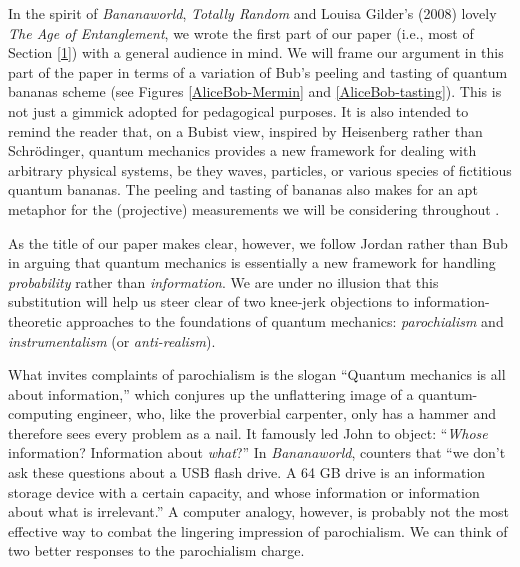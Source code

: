 In the spirit of \emph{Bananaworld}, \emph{Totally Random} and Louisa Gilder's (2008) lovely \emph{The Age of Entanglement}, we wrote the first part of our paper (i.e., most of Section \ref{1}) with a general audience in mind. We will frame our argument in this part of the paper in terms of a variation of Bub's peeling and tasting of quantum bananas scheme (see Figures \ref{AliceBob-Mermin} and \ref{AliceBob-tasting}). This is not just a gimmick adopted for pedagogical purposes. It is also intended to remind the reader that, on a Bubist view, inspired by Heisenberg rather than Schr\"odinger, quantum mechanics provides a new framework for dealing with arbitrary physical systems, be they waves, particles, or various species of fictitious quantum bananas. The peeling and tasting of bananas also makes for an apt metaphor for the (projective) measurements we will be considering throughout \citep{Popescu 2016}. 

As the title of our paper makes clear, however, we follow Jordan rather than Bub in arguing that quantum mechanics is essentially a new framework for handling \emph{probability} rather than \emph{information}. We are under no illusion that this substitution will help us steer clear of two knee-jerk objections to information-theoretic approaches to the foundations of quantum mechanics: \emph{parochialism} and \emph{instrumentalism} (or \emph{anti-realism}).

What invites complaints of parochialism is the slogan ``Quantum mechanics is all about information,'' which conjures up the unflattering image of a quantum-computing engineer, who, like the proverbial carpenter, only has a hammer and therefore sees every problem as a nail. It famously led John \citet[p.\ 34]{Bell 1990} to object: ``\emph{Whose} information? Information about \emph{what}?'' In \emph{Bananaworld}, \citet[p.\ 7]{Bub 2016} counters that ``we don't ask these questions about a USB flash drive. A 64 GB drive is an information storage device with a certain capacity, and whose information or information about what is irrelevant.'' A computer analogy, however, is probably not the most effective way to combat the lingering impression of parochialism. We can think of two better responses to the parochialism charge.

